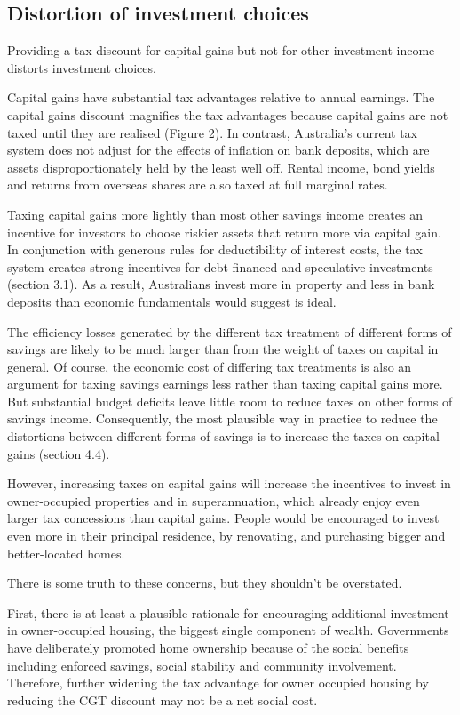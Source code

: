 \documentclass{grattan}\usepackage[]{graphicx}\usepackage[]{color}
\begin{document}
\subsection{Distortion of investment choices}
Providing a tax discount for capital gains but not for other investment income distorts investment choices. 

Capital gains have substantial tax advantages relative to annual earnings. The capital gains discount magnifies the tax advantages because capital gains are not taxed until they are realised (Figure 2). In contrast, Australia's current tax system does not adjust for the effects of inflation on bank deposits, which are assets disproportionately held by the least well off.  Rental income, bond yields and returns from overseas shares are also taxed at full marginal rates.

Taxing capital gains more lightly than most other savings income creates an incentive for investors to choose riskier assets that return more via capital gain. In conjunction with generous rules for deductibility of interest costs, the tax system creates strong incentives for debt-financed and speculative investments (section 3.1). As a result, Australians invest more in property and less in bank deposits than economic fundamentals would suggest is ideal.

The efficiency losses generated by the different tax treatment of different forms of savings are likely to be much larger than from the weight of taxes on capital in general.   Of course, the economic cost of differing tax treatments is also an argument for taxing savings earnings less rather than taxing capital gains more. But substantial budget deficits leave little room to reduce taxes on other forms of savings income. Consequently, the most plausible way in practice to reduce the distortions between different forms of savings is to increase the taxes on capital gains (section 4.4). 

However, increasing taxes on capital gains will increase the incentives to invest in owner-occupied properties and in superannuation, which already enjoy even larger tax concessions than capital gains. People would be encouraged to invest even more in their principal residence, by renovating, and purchasing bigger and better-located homes. 

There is some truth to these concerns, but they shouldn't be overstated. 

First, there is at least a plausible rationale for encouraging additional investment in owner-occupied housing,  the biggest single component of wealth.  Governments have deliberately promoted home ownership because of the social benefits including enforced savings, social stability and community involvement.  Therefore, further widening the tax advantage for owner occupied housing by reducing the CGT discount may not be a net social cost. 
\end{document}
